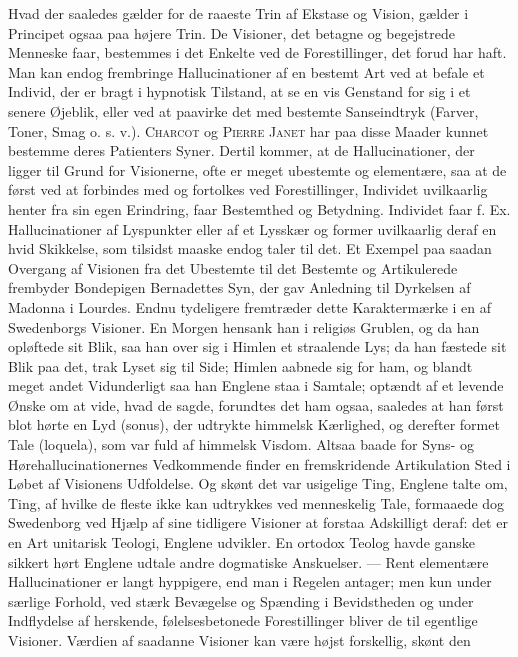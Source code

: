 \documentclass[12pt,a4paper,openany]{book}
\newcommand{\opage}[1]{\marginnote{\footnotesize\textit{[#1]}}}
\begin{document}
Hvad der saaledes gælder for de raaeste Trin af Ekstase og Vision,
gælder i Principet ogsaa paa højere Trin. De Visioner, det betagne og
begejstrede Menneske faar, bestemmes i det Enkelte ved de
Forestillinger, det forud har haft. Man kan endog frembringe
Hallucinationer af en bestemt Art ved at befale et Individ, der er bragt
i hypnotisk Tilstand, at se en vis Genstand for sig i et senere Øjeblik,
eller ved at paavirke det med bestemte Sanseindtryk (Farver, Toner, Smag
o. s. v.). \textsc{Charcot} og \textsc{Pierre Janet} har paa disse
Maader kunnet bestemme deres Patienters Syner. Dertil kommer, at de
Hallucinationer, der ligger til Grund for Visionerne, ofte er meget
ubestemte og elementære, saa at de først ved at forbindes med og
fortolkes ved Forestillinger, Individet uvilkaarlig henter fra sin egen
Erindring, faar Bestemthed og Betydning. Individet faar f. Ex.
Hallucinationer af Lyspunkter eller af et Lysskær og former uvilkaarlig
deraf en hvid Skikkelse, som tilsidst maaske endog taler til det. Et
Exempel paa saadan Overgang af Visionen fra det Ubestemte til det
Bestemte og Artikulerede frembyder Bondepigen Bernadettes Syn, der gav
Anledning til Dyrkelsen af Madonna i Lourdes. Endnu tydeligere
fremtræder dette Karaktermærke i en af Swedenborgs Visioner. En Morgen
hensank han i religiøs Grublen, og da han opløftede sit Blik, saa han
over sig i Himlen et straalende Lys; da han fæstede sit Blik paa det,
trak Lyset sig til Side; Himlen aabnede sig for ham, og blandt meget
andet Vidunderligt saa han Englene staa i Samtale; optændt af et levende
Ønske om at vide, hvad de sagde, forundtes det ham ogsaa, saaledes at
han først blot hørte en Lyd (sonus), der udtrykte himmelsk Kærlighed, og
derefter formet Tale (loquela), som var fuld af himmelsk Visdom. Altsaa
baade for Syns- og Hørehallucinationernes Vedkommende finder en
fremskridende Artikulation Sted i Løbet af Visionens Udfoldelse. Og
skønt det var usigelige Ting, Englene talte om, Ting, af hvilke de
fleste ikke kan udtrykkes ved menneskelig Tale, formaaede dog Swedenborg
ved Hjælp af sine tidligere Visioner at forstaa Adskilligt deraf: det er
en Art unitarisk Teologi, Englene udvikler. En ortodox Teolog havde
ganske sikkert hørt Englene udtale andre dogmatiske Anskuelser. ---
\opage{111}Rent elementære Hallucinationer er langt hyppigere, end man i
Regelen antager; men kun under særlige Forhold, ved stærk Bevægelse og
Spænding i Bevidstheden og under Indflydelse af herskende,
følelsesbetonede Forestillinger bliver de til egentlige Visioner.
Værdien af saadanne Visioner kan være højst forskellig, skønt den
\end{document}
